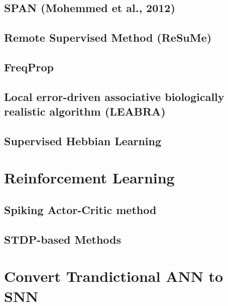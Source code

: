 












\subsection{SPAN (Mohemmed et al., 2012)}

\subsection{Remote Supervised Method (ReSuMe)}
\subsection{FreqProp}
\subsection{Local error-driven associative biologically realistic algorithm (LEABRA)}
\subsection{Supervised Hebbian Learning}

\section{Reinforcement Learning}
\subsection{Spiking Actor-Critic method}
\subsection{STDP-based Methods}

\section{Convert Trandictional ANN to SNN}